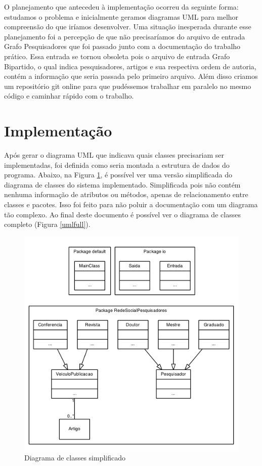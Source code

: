 \documentclass[12pt]{article}
\begin{document}
O planejamento que antecedeu à implementação ocorreu da seguinte forma: estudamos o problema e inicialmente geramos diagramas UML para melhor compreensão do que iríamos desenvolver.
Uma situação inesperada durante esse planejamento foi a percepção de que não precisaríamos do arquivo de entrada Grafo Pesquisadores que foi passado junto com a documentação do trabalho prático. Essa entrada se tornou obsoleta pois o arquivo de entrada Grafo Bipartido, o qual indica pesquisadores, artigos e sua respectiva ordem de autoria, contém a informação que seria passada pelo primeiro arquivo.
Além disso criamos um repositório git online para que pudéssemos trabalhar em paralelo no mesmo código e caminhar rápido com o trabalho.

\section{Implementação}
\label{implementacao}

Após gerar o diagrama UML que indicava quais classes precisariam ser implementadas, foi definida como seria montada a estrutura de dados do programa. Abaixo, na Figura \ref{uml}, é possível ver uma versão simplificada do diagrama de classes do sistema implementado. Simplificada pois não contém nenhuma informação de atributos ou métodos, apenas de relacionamento entre classes e pacotes. 
Isso foi feito para não poluir a documentação com um diagrama tão complexo. Ao final deste documento é possível ver o diagrama de classes completo (Figura \ref{umlfull}).


\begin{figure}[h!]
	\centering
	\includegraphics[width=.8\textwidth]{umlsmall.png}
	\caption{Diagrama de classes simplificado}
	\label{uml}
\end{figure}
\end{document}

